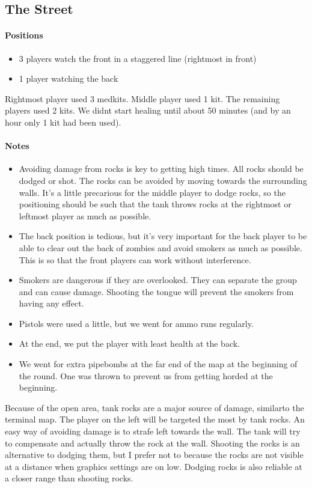 \subsection{The Street}
\paragraph{Positions}
\begin{itemize}
\item 3 players watch the front in a staggered line (rightmost in front)
\item 1 player watching the back
\end{itemize}

Rightmost player used 3 medkits. Middle player used 1 kit. The remaining players used 2 kits. We didnt start healing until about 50 minutes (and by an hour only 1 kit had been used).

\paragraph{Notes}
\begin{itemize}
\item Avoiding damage from rocks is key to getting high times. All rocks should be dodged or shot. The rocks can be avoided by moving towards the surrounding walls. It's a little precarious for the middle player to dodge rocks, so the positioning should be such that the tank throws rocks at the rightmost or leftmost player as much as possible.
\item The back position is tedious, but it's very important for the back player to be able to clear out the back of zombies and avoid smokers as much as possible. This is so that the front players can work without interference.
\item Smokers are dangerous if they are overlooked. They can separate the group and can cause damage. Shooting the tongue will prevent the smokers from having any effect.
\item Pistols were used a little, but we went for ammo runs regularly.
\item At the end, we put the player with least health at the back.
\item We went for extra pipebombs at the far end of the map at the beginning of the round. One was thrown to prevent us from getting horded at the beginning.
\end{itemize}

Because of the open area, tank rocks are a major source of damage, similarto the terminal map. The player on the left will be targeted the most by tank rocks. An easy way of avoiding damage is to strafe left towards the wall. The tank will try to compensate and actually throw the rock at the wall. Shooting the rocks is an alternative to dodging them, but I prefer not to because the rocks are not visible at a distance when graphics settings are on low. Dodging rocks is also reliable at a closer range than shooting rocks.

